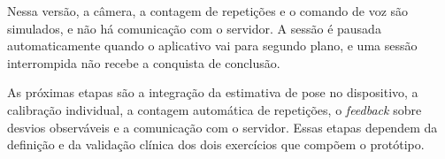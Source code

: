 Nessa versão, a câmera, a contagem de repetições e o comando de voz são simulados, e não há comunicação com o servidor. A sessão é pausada automaticamente quando o aplicativo vai para segundo plano, e uma sessão interrompida não recebe a conquista de conclusão.

As próximas etapas são a integração da estimativa de pose no dispositivo, a calibração individual, a contagem automática de repetições, o \textit{feedback} sobre desvios observáveis e a comunicação com o servidor. Essas etapas dependem da definição e da validação clínica dos dois exercícios que compõem o protótipo.
